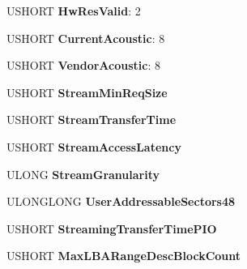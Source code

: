\begin{DoxyCompactItemize}
U\+S\+H\+O\+RT {\bfseries Hw\+Res\+Valid}\+: 2
\item 
\mbox{\label{struct___i_d_e_n_t_i_f_y___d_a_t_a_a2f736187676e77a6a668fb167b0c6da0}} 
U\+S\+H\+O\+RT {\bfseries Current\+Acoustic}\+: 8
\item 
\mbox{\label{struct___i_d_e_n_t_i_f_y___d_a_t_a_a0f5da1daea65aaaac4fb82baca820b3f}} 
U\+S\+H\+O\+RT {\bfseries Vendor\+Acoustic}\+: 8
\item 
\mbox{\label{struct___i_d_e_n_t_i_f_y___d_a_t_a_a439104a7a4fad8f5cd6503f50a125248}} 
U\+S\+H\+O\+RT {\bfseries Stream\+Min\+Req\+Size}
\item 
\mbox{\label{struct___i_d_e_n_t_i_f_y___d_a_t_a_aa50c688097cea4d6469ecaef65546bde}} 
U\+S\+H\+O\+RT {\bfseries Stream\+Transfer\+Time}
\item 
\mbox{\label{struct___i_d_e_n_t_i_f_y___d_a_t_a_a5284eb6d3c2b2c02333c3ffe554c8399}} 
U\+S\+H\+O\+RT {\bfseries Stream\+Access\+Latency}
\item 
\mbox{\label{struct___i_d_e_n_t_i_f_y___d_a_t_a_a9641b0f1e9087172570afb83e93faf65}} 
U\+L\+O\+NG {\bfseries Stream\+Granularity}
\item 
\mbox{\label{struct___i_d_e_n_t_i_f_y___d_a_t_a_a57c9d7d8048f045f779eb6b4f8466bdd}} 
U\+L\+O\+N\+G\+L\+O\+NG {\bfseries User\+Addressable\+Sectors48}
\item 
\mbox{\label{struct___i_d_e_n_t_i_f_y___d_a_t_a_a069264c2dc2ed12b19061bec09e002cc}} 
U\+S\+H\+O\+RT {\bfseries Streaming\+Transfer\+Time\+P\+IO}
\item 
\mbox{\label{struct___i_d_e_n_t_i_f_y___d_a_t_a_a13111896df4c7070b42a3066f636ff31}} 
U\+S\+H\+O\+RT {\bfseries Max\+L\+B\+A\+Range\+Desc\+Block\+Count}
\item 
\mbox{\label{struct___i_d_e_n_t_i_f_y___d_a_t_a_a32d6e6f20b929ea5f995db59a875809c}} 

\end{DoxyCompactItemize}
